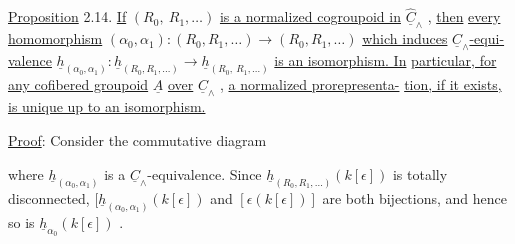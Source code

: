 \underline{Proposition} 2.14.  \underline{If} $(R_0,\ R_1,\ldots)$ \underline{is a normalized cogroupoid in} $\widehat{\underline{C}}_\wedge$ , \underline{then} \underline{every homomorphism} $(\alpha_0,\alpha_1) : (R_0,R_1,\ldots) \to (R_0,R_1,\ldots)$ \underline{which induces} $\underline{C}_\wedge$\underline{-equi-} \underline{valence} $\underline{h}_{(\alpha_0,\alpha_1)} : \underline{h}_{(R_0,R_1,\ldots)} \longrightarrow \underline{h}_{(R_0,\ R_1,\ldots)}$ \underline{is an isomorphism. In}
\underline{particular, for any cofibered groupoid} $\underline{A}$ \underline{over} $\underline{C}_\wedge$ , \underline{a normalized prorepresenta-} \underline{tion, if it exists, is unique up to an isomorphism.}

\underline{Proof}:  Consider the commutative diagram

\begin{center}
\end{center}
where $\underline{h}_{(\alpha_0,\alpha_1)}$ is a $\underline{C}_\wedge$-equivalence. Since $\underline{h}_{(R_0,R_1,\ldots)}(k[\epsilon])$ is totally disconnected, $[\underline{h}_{(\alpha_0,\alpha_1)}(k[\epsilon])$ and $[\epsilon(k[\epsilon])]$ are both bijections, and hence so is $\underline{h}_{\alpha_0}(k[\epsilon])$ .

